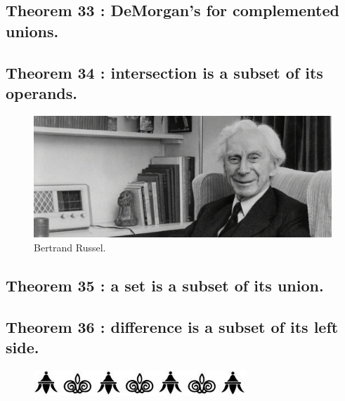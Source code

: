 \documentclass[preview]{standalone}
\begin{document}
\subsection[DeMorgan's Law for a complemented union.]
    {
        \color{section}Theorem 33 \color{black} : DeMorgan's for complemented unions.
    }

\pagebreak


\subsection[Intersection is a subset of its operands.]
    {
        \color{section}Theorem 34 \color{black} : intersection is a subset of its operands.
    }

\vspace{2\baselineskip}
\begin{figure}[!h]
    \centering
    \includegraphics[width=14cm]{../resources/jpg/2.2.set.operations/russel.jpg}
    \caption*{Bertrand Russel.}
\end{figure}


\subsection[A set is a subset of its union.]
    {
        \color{section}Theorem 35 \color{black} : a set is a subset of its union.
    }

\pagebreak


\subsection[Set difference is a subset of its left-hand side.]
    {
        \color{section}Theorem 36 \color{black} : difference is a subset of its left side.
    }

\vspace{1.5\baselineskip}
\begin{figure}[!h]
    \centering
    \includegraphics[width=8cm]{../resources/jpg/2.2.set.operations/border5.jpg}
\end{figure}
\vspace{1\baselineskip}
\end{document}
